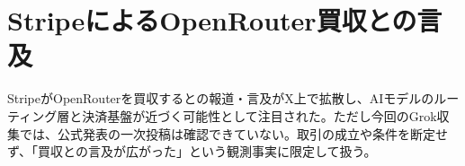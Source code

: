 \section{StripeによるOpenRouter買収との言及}
StripeがOpenRouterを買収するとの報道・言及がX上で拡散し、AIモデルのルーティング層と決済基盤が近づく可能性として注目された。ただし今回のGrok収集では、公式発表の一次投稿は確認できていない。取引の成立や条件を断定せず、「買収との言及が広がった」という観測事実に限定して扱う。

